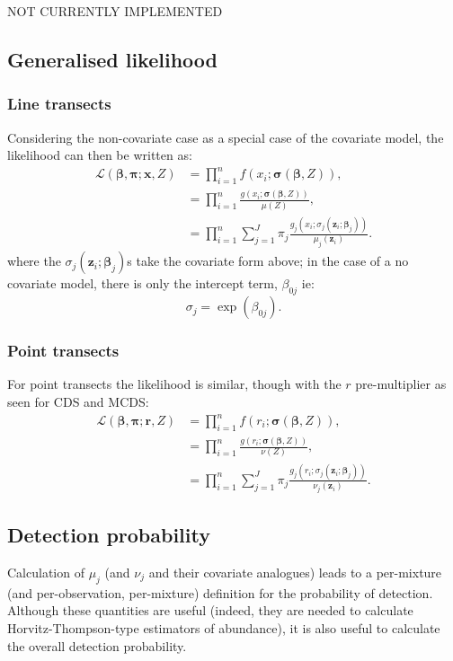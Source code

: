 NOT CURRENTLY IMPLEMENTED

\subsection{Generalised likelihood}
\label{ds-genlik}

\subsubsection{Line transects}
Considering the non-covariate case as a special case of the covariate model, the likelihood can then be written as:
\begin{align}
\mathcal{L}(\bm{\beta}, \bm{\pi} ; \bm{x}, Z) &= \prod_{i=1}^n f(x_i;\bm{\sigma}(\bm{\beta},Z)),\\
&= \prod_{i=1}^n \frac{g(x_i;\bm{\sigma}(\bm{\beta},Z))}{\mu(Z)},\\
&= \prod_{i=1}^n \sum_{j=1}^J \pi_j \frac{g_j(x_i; \sigma_j(\bm{z}_i;\bm{\beta}_j))}{ \mu_j(\bm{z}_i)}.
\label{mmds-lt-glikelihood}
\end{align}
where the $\sigma_j(\bm{z}_i;\bm{\beta}_j)$s take the covariate form above; in the case of a no covariate model, there is only the intercept term, $\beta_{0j}$ ie:
\begin{equation}
\sigma_j = \exp ( \beta_{0j} ).
\end{equation}

\subsubsection{Point transects}
For point transects the likelihood is similar, though with the $r$ pre-multiplier as seen for CDS and MCDS:
\begin{align}
\mathcal{L}(\bm{\beta}, \bm{\pi} ; \bm{r}, Z) &= \prod_{i=1}^n f(r_i;\bm{\sigma}(\bm{\beta},Z)),\\
&= \prod_{i=1}^n \frac{g(r_i;\bm{\sigma}(\bm{\beta},Z))}{\nu(Z)},\\
&= \prod_{i=1}^n \sum_{j=1}^J \pi_j \frac{g_j(r_i; \sigma_j(\bm{z}_i;\bm{\beta}_j))}{ \nu_j(\bm{z}_i)}.
\label{mmds-pt-glikelihood}
\end{align}



\subsection{Detection probability}
Calculation of $\mu_j$ (and $\nu_j$ and their covariate analogues) leads to a per-mixture (and per-observation, per-mixture) definition for the probability of detection. Although these quantities are useful (indeed, they are needed to calculate Horvitz-Thompson-type estimators of abundance), it is also useful to calculate the overall detection probability.




